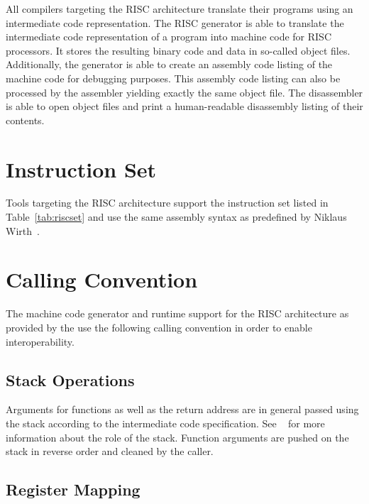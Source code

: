 All compilers targeting the RISC architecture translate their programs using an intermediate code representation.
The RISC generator is able to translate the intermediate code representation of a program into machine code for RISC processors.
It stores the resulting binary code and data in so-called object files.
Additionally, the generator is able to create an assembly code listing of the machine code for debugging purposes.
This assembly code listing can also be processed by the assembler yielding exactly the same object file.
The disassembler is able to open object files and print a human-readable disassembly listing of their contents.
\seeobject\seecode

\section{Instruction Set}

Tools targeting the RISC architecture support the instruction set listed in Table~\ref{tab:riscset} and use the same assembly syntax as predefined by Niklaus Wirth~\cite{risc:instructionset}.
\seeassembly


\section{Calling Convention}

The machine code generator and runtime support for the RISC architecture as provided by the \ecs{} use the following calling convention in order to enable interoperability.

\subsection{Stack Operations}

Arguments for functions as well as the return address are in general passed using the stack according to the intermediate code specification.
See \Documentation{}~ for more information about the role of the stack.
Function arguments are pushed on the stack in reverse order and cleaned by the caller.

\subsection{Register Mapping}

